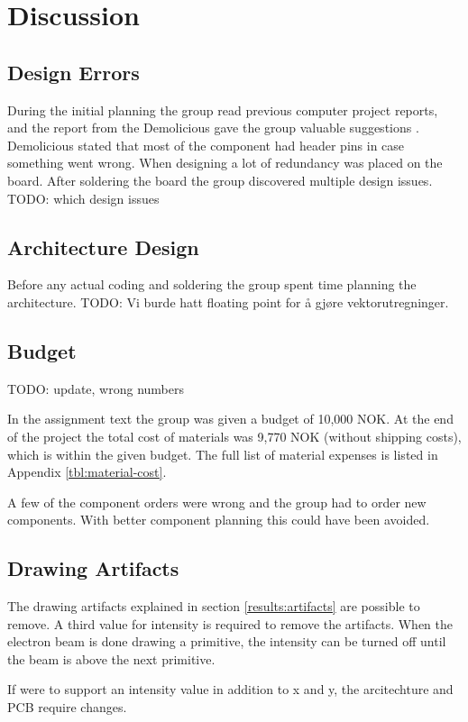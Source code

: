 \chapter{Discussion}

\section{Design Errors}
During the initial planning the group read previous computer project reports,
and the report from the Demolicious gave the group valuable suggestions \cite{demolicious-report}.
Demolicious stated that most of the component had header pins in case something went wrong.
When designing a lot of redundancy was placed on the board.
After soldering the board the group discovered multiple design issues. TODO: which design issues

\section{Architecture Design}
Before any actual coding and soldering the group spent time planning the architecture.
TODO: Vi burde hatt floating point for å gjøre vektorutregninger.

\section{Budget}
TODO: update, wrong numbers

In the assignment text the group was given a budget of 10,000 NOK.
At the end of the project the total cost of materials was 9,770 NOK (without shipping costs), which is within the given budget.
The full list of material expenses is listed in Appendix \ref{tbl:material-cost}.

A few of the component orders were wrong and the group had to order new components.
With better component planning this could have been avoided.



\section{Drawing Artifacts}
\label{discussion:artifacts}
The drawing artifacts explained in section \ref{results:artifacts} are possible to remove.
A third value for intensity is required to remove the artifacts.
When the electron beam is done drawing a primitive, the intensity can be turned off until the beam is above the next primitive.

If \vthreek were to support an intensity value in addition to x and y, the arcitechture and PCB require changes.
